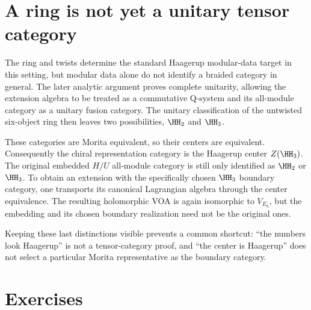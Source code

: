 \section{A ring is not yet a unitary tensor category}

The ring and twists determine the standard Haagerup modular-data target
in this setting, but modular data alone do not identify a braided
category in general. The later analytic argument proves complete
unitarity, allowing the extension algebra to be treated as a
commutative Q-system and its all-module category as a unitary fusion
category. The unitary classification of the untwisted six-object ring
then leaves two possibilities, $\HH_2$ and $\HH_3$.

These categories are Morita equivalent, so their centers are equivalent.
Consequently the chiral representation category is the Haagerup center
$Z(\HH_3)$. The original embedded $H/U$ all-module category is still
only identified as $\HH_2$ or $\HH_3$. To obtain an extension with
the specifically chosen $\HH_3$ boundary category, one transports its
canonical Lagrangian algebra through the center equivalence. The
resulting holomorphic VOA is again isomorphic to $V_{E_8}$, but the
embedding and its chosen boundary realization need not be the original
ones.

Keeping these last distinctions visible prevents a common shortcut:
``the numbers look Haagerup'' is not a tensor-category proof, and
``the center is Haagerup'' does not select a particular Morita
representative as the boundary category.

\section{Exercises}

